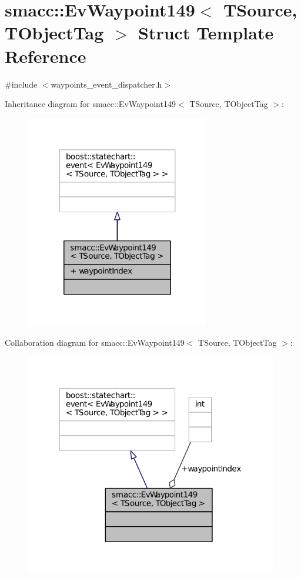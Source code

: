 \hypertarget{structsmacc_1_1EvWaypoint149}{}\section{smacc\+:\+:Ev\+Waypoint149$<$ T\+Source, T\+Object\+Tag $>$ Struct Template Reference}
\label{structsmacc_1_1EvWaypoint149}


{\ttfamily \#include $<$waypoints\+\_\+event\+\_\+dispatcher.\+h$>$}



Inheritance diagram for smacc\+:\+:Ev\+Waypoint149$<$ T\+Source, T\+Object\+Tag $>$\+:
\nopagebreak
\begin{figure}[H]
\begin{center}
\leavevmode
\includegraphics[width=227pt]{structsmacc_1_1EvWaypoint149__inherit__graph}
\end{center}
\end{figure}


Collaboration diagram for smacc\+:\+:Ev\+Waypoint149$<$ T\+Source, T\+Object\+Tag $>$\+:
\nopagebreak
\begin{figure}[H]
\begin{center}
\leavevmode
\includegraphics[width=312pt]{structsmacc_1_1EvWaypoint149__coll__graph}
\end{center}
\end{figure}
